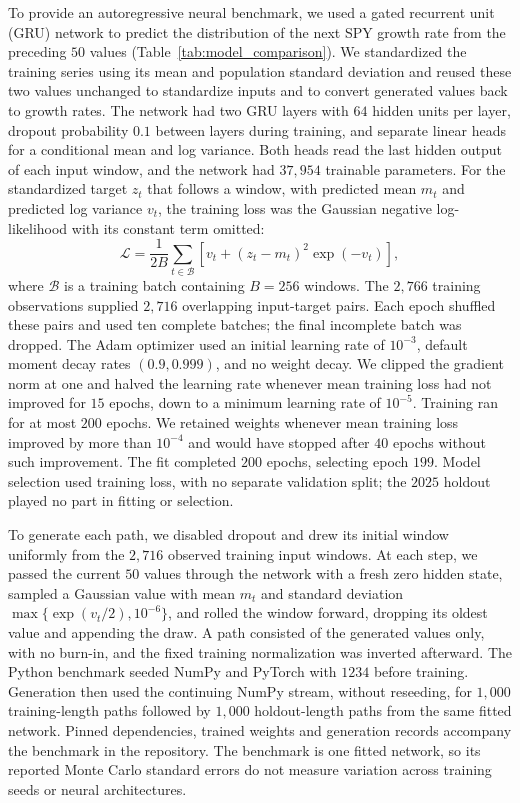To provide an autoregressive neural benchmark, we used a gated
recurrent unit (GRU) network to predict the distribution of the next
SPY growth rate from the preceding $50$ values
(Table~\ref{tab:model_comparison}). We standardized the training
series using its mean and population standard deviation and reused
these two values unchanged to standardize inputs and to convert
generated values back to growth rates. The network had two GRU layers
with $64$ hidden units per layer, dropout probability $0.1$ between
layers during training, and separate linear heads for a conditional
mean and log variance. Both heads read the last hidden output of each
input window, and the network had $37{,}954$ trainable parameters.
For the standardized target $z_t$ that follows a window, with
predicted mean $m_t$ and predicted log variance $v_t$, the training
loss was the Gaussian negative log-likelihood with its constant term
omitted:
\begin{equation}
 \mathcal L=\frac{1}{2B}\sum_{t\in\mathcal B}
       \left[v_t+(z_t-m_t)^2\exp(-v_t)\right],
 \label{eq:gru-loss}
\end{equation}
where $\mathcal B$ is a training batch containing $B=256$ windows.
The $2{,}766$ training observations supplied $2{,}716$ overlapping
input-target pairs. Each epoch shuffled these pairs and used ten
complete batches; the final incomplete batch was dropped. The Adam
optimizer used an initial learning rate of $10^{-3}$, default moment
decay rates $(0.9,0.999)$, and no weight decay. We clipped the
gradient norm at one and halved the learning rate whenever mean
training loss had not improved for $15$ epochs, down to a minimum
learning rate of $10^{-5}$. Training ran for at most $200$ epochs. We
retained weights whenever mean training loss improved by more than
$10^{-4}$ and would have stopped after $40$ epochs without such
improvement. The fit completed $200$ epochs, selecting epoch $199$. Model selection used training loss, with no separate
validation split; the $2025$ holdout played no part in fitting or
selection.

To generate each path, we disabled dropout and drew its initial
window uniformly from the $2{,}716$ observed training input windows.
At each step, we passed the current $50$ values through the network
with a fresh zero hidden state, sampled a Gaussian value with mean
$m_t$ and standard deviation $\max\{\exp(v_t/2),10^{-6}\}$, and
rolled the window forward, dropping its oldest value and appending
the draw. A path consisted of the generated values only, with no
burn-in, and the fixed training normalization was inverted afterward.
The Python benchmark seeded NumPy and PyTorch with $1234$ before
training. Generation then used the continuing NumPy stream, without
reseeding, for $1{,}000$ training-length paths followed by $1{,}000$
holdout-length paths from the same fitted network.
Pinned dependencies, trained weights and generation records accompany the benchmark in the repository. The
benchmark is one fitted network, so its reported Monte Carlo standard
errors do not measure variation across training seeds or neural
architectures.

